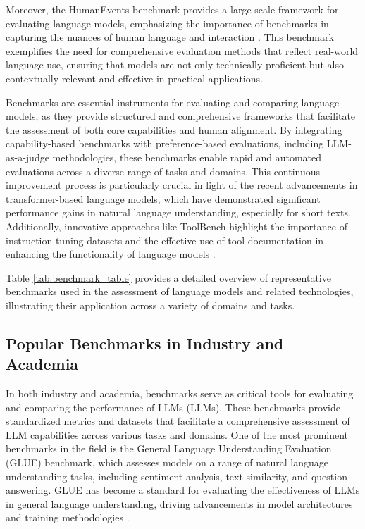 Moreover, the HumanEvents benchmark provides a large-scale framework for evaluating language models, emphasizing the importance of benchmarks in capturing the nuances of human language and interaction \cite{lin2023humaneventslargescalebenchmark}. This benchmark exemplifies the need for comprehensive evaluation methods that reflect real-world language use, ensuring that models are not only technically proficient but also contextually relevant and effective in practical applications.

Benchmarks are essential instruments for evaluating and comparing language models, as they provide structured and comprehensive frameworks that facilitate the assessment of both core capabilities and human alignment. By integrating capability-based benchmarks with preference-based evaluations, including LLM-as-a-judge methodologies, these benchmarks enable rapid and automated evaluations across a diverse range of tasks and domains. This continuous improvement process is particularly crucial in light of the recent advancements in transformer-based language models, which have demonstrated significant performance gains in natural language understanding, especially for short texts. Additionally, innovative approaches like ToolBench highlight the importance of instruction-tuning datasets and the effective use of tool documentation in enhancing the functionality of language models \cite{ginzburg2021selfsuperviseddocumentsimilarityranking,liu2023bolaabenchmarkingorchestratingllmaugmented,JudgingLLM2}.

Table \ref{tab:benchmark_table} provides a detailed overview of representative benchmarks used in the assessment of language models and related technologies, illustrating their application across a variety of domains and tasks.



\subsection{Popular Benchmarks in Industry and Academia} \label{subsec:Popular Benchmarks in Industry and Academia}



In both industry and academia, benchmarks serve as critical tools for evaluating and comparing the performance of LLMs (LLMs). These benchmarks provide standardized metrics and datasets that facilitate a comprehensive assessment of LLM capabilities across various tasks and domains. One of the most prominent benchmarks in the field is the General Language Understanding Evaluation (GLUE) benchmark, which assesses models on a range of natural language understanding tasks, including sentiment analysis, text similarity, and question answering. GLUE has become a standard for evaluating the effectiveness of LLMs in general language understanding, driving advancements in model architectures and training methodologies \cite{wang2023environmenttransformerpolicyoptimization}.



